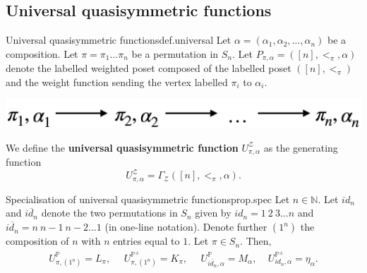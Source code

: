 \documentclass[numbers=enddot,12pt,final,onecolumn,notitlepage]{scrartcl}%
\newcommand{\NN}{\mathbb{N}} %
\newcommand{\PP}{\mathbb{P}} %
\newcommand{\0}{\phantom{c}}
\begin{document}
\subsection{Universal quasisymmetric functions}
\begin{definition}{Universal quasisymmetric functions}{def.universal}
Let $\alpha = (\alpha_1, \alpha_2, \ldots, \alpha_n)$ be a composition.
Let $\pi=\pi_1\dots\pi_n$ be a permutation in $S_n$.
Let $P_{\pi,\alpha} = ([n],<_\pi,\alpha)$ denote the labelled weighted poset composed of the labelled poset $([n], <_\pi)$ and the weight function sending the vertex labelled $\pi_i$ to $\alpha_i$.
\begin{center}
\includegraphics[scale=0.20]{PosetMonomial.pdf}
 \label{fig : monomial}
 \end{center}
We define the \textbf{universal quasisymmetric function} $U^\mathcal{Z}_{\pi,\alpha}$ as the generating function
\begin{equation}
U^\mathcal{Z}_{\pi,\alpha} = \Gamma_\mathcal{Z}([n],<_\pi, \alpha).
\end{equation}
\end{definition}

\begin{proposition}{Specialisation of universal quasisymmetric functions}{prop.spec}
\indent Let $n \in \NN$. Let $id_{n}$ and $\overline{id_{n}}$ denote the two permutations in $S_n$ given by $id_{n} = 1~2~3\dots n$ and $\overline{id_{n}} = n~n-1~n-2\dots 1$ (in one-line notation). Denote further $(1^n)$ the composition of $n$ with $n$ entries equal to $1$. Let $\pi \in S_n$. Then,
\begin{align}
\label{eq : UE} U^\mathcal{\PP}_{\pi,(1^n)} = L_\pi, ~~~~~~U^\mathcal{\PP^\pm}_{\pi,(1^n)} = K_\pi, ~~~~~~U^{\mathcal{\PP}}_{\overline{id_{n}},\alpha} = M_{\alpha},
~~~~~U^{\mathcal{\PP^\pm}}_{id_{n},\alpha} = \eta_{\alpha}.
\end{align}

\end{proposition}

\end{document}
